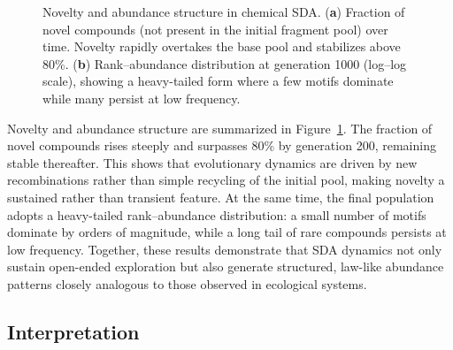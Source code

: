 \documentclass[life,article,submit,pdftex,moreauthors]{Definitions/mdpi}
\begin{document}
\begin{figure}[H]
\centering
{}
\hfill
{}
\caption{Novelty and abundance structure in chemical SDA. (\textbf{a}) Fraction of novel compounds (not present in the initial fragment pool) over time. Novelty rapidly overtakes the base pool and stabilizes above 80\%. (\textbf{b}) Rank--abundance distribution at generation 1000 (log--log scale), showing a heavy-tailed form where a few motifs dominate while many persist at low frequency.}
\label{fig:chem-novel-rank}
\end{figure}

Novelty and abundance structure are summarized in Figure~\ref{fig:chem-novel-rank}. The fraction of novel compounds rises steeply and surpasses 80\% by generation 200, remaining stable thereafter. This shows that evolutionary dynamics are driven by new recombinations rather than simple recycling of the initial pool, making novelty a sustained rather than transient feature. At the same time, the final population adopts a heavy-tailed rank--abundance distribution: a small number of motifs dominate by orders of magnitude, while a long tail of rare compounds persists at low frequency. Together, these results demonstrate that SDA dynamics not only sustain open-ended exploration but also generate structured, law-like abundance patterns closely analogous to those observed in ecological systems.


\subsection{Interpretation}
\end{document}

